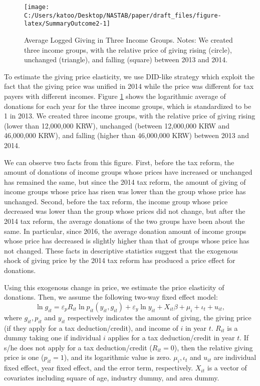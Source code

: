 \documentclass[
  11pt,
  a4paper,
]{article}
\begin{document}
\begin{figure}[t]

{\centering \texttt{[image: C:/Users/katoo/Desktop/NASTAB/paper/draft\_files/figure-latex/SummaryOutcome2-1]} 

}

\caption{Average Logged Giving in Three Income Groups. Notes: We created three income groups, with the relative price of giving rising (circle), unchanged (triangle), and falling (square) between 2013 and 2014.}\label{fig:SummaryOutcome2}
\end{figure}

To estimate the giving price elasticity,
we use DID-like strategy which exploit the fact that the giving price was unified in 2014
while the price was different for tax payers with different incomes.
Figure \ref{fig:SummaryOutcome2} shows the logarithmic average of donations for each year for the three income groups, which is standardized to be 1 in 2013.
We created three income groups, with the relative price of giving rising (lower than 12,000,000 KRW),
unchanged (between 12,000,000 KRW and 46,000,000 KRW),
and falling (higher than 46,000,000 KRW) between 2013 and 2014.

We can observe two facts from this figure.
First, before the tax reform, the amount of donations of income groups whose prices have increased or unchanged has remained the same,
but since the 2014 tax reform, the amount of giving of income groups whose price has risen was lower than the group whose price has unchanged.
Second, before the tax reform, the income group whose price decreased was lower than the group whose prices did not change,
but after the 2014 tax reform, the average donations of the two groups have been about the same.
In particular, since 2016,
the average donation amount of income groups whose price has decreased is slightly higher than that of groups whose price has not changed.
These facts in descriptive statistics suggest that
the exogenous shock of giving price by the 2014 tax reform has produced a price effect for donations.

Using this exogenous change in price, we estimate the price elasticity of donations.
Then, we assume the following two-way fixed effect model:
\begin{equation}
    \ln g_{it} = \varepsilon_p R_{it} \ln p_{it}(y_{it}, g_{it}) + \varepsilon_y \ln y_{it} 
    + X_{it}\beta +\mu_i +\iota_t +u_{it}, \label{eq:intensive}
\end{equation}
where \(g_{it}, p_{it}\) and \(y_{it}\) respectively indicates
the amount of giving, the giving price (if they apply for a tax deduction/credit), and income of \(i\) in year \(t\).
\(R_{it}\) is a dummy taking one if individual \(i\) applies for a tax deduction/credit in year \(t\).
If s/he does not apply for a tax deduction/credit (\(R_{it} = 0\)), then the relative giving price is one (\(p_{it} = 1\)),
and its logarithmic value is zero.
\(\mu_i, \iota_t\) and \(u_{it}\) are individual fixed effect, year fixed effect, and the error term, respectively.
\(X_{it}\) is a vector of covariates including square of age, industry dummy, and area dummy.
\end{document}
